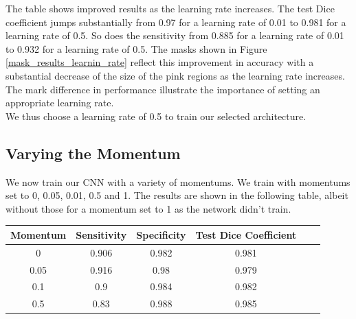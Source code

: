 \noindent The table shows improved results as the learning rate increases. The test Dice coefficient jumps substantially from 0.97 for a learning rate of 0.01 to 0.981 for a learning rate of 0.5. So does the sensitivity from 0.885 for a learning rate of 0.01 to 0.932 for a learning rate of 0.5. The masks shown in Figure \ref{mask_results_learnin_rate} reflect this improvement in accuracy with a substantial decrease of the size of the pink regions as the learning rate increases. The mark difference in performance illustrate the importance of setting an appropriate learning rate.\\

\noindent We thus choose a learning rate of 0.5 to train our selected architecture.

\subsection{Varying the Momentum}

\noindent We now train our CNN with a variety of momentums. We train with momentums set to 0, 0.05, 0.01, 0.5 and 1. The results are shown in the following table, albeit without those for a momentum set to 1 as the network didn't train.\\

{
\centering
\begin{tabular}{cccccc}
\rowcolor[HTML]{C0C0C0} 
Momentum & Sensitivity & Specificity & Test Dice Coefficient \\ \hline
\rowcolor[HTML]{FFFFFF} 
0        & 0.906       & 0.982       & 0.981                                                        \\ 
\rowcolor[HTML]{FFFFFF} 
0.05     & 0.916       & 0.98       & 0.979                                                        \\ 
\rowcolor[HTML]{FFFFFF} 
0.1      & 0.9         & 0.984         & 0.982                                                        \\
\rowcolor[HTML]{FFFFFF} 
0.5      & 0.83        & 0.988        & 0.985                                                       
\end{tabular}\\
\vspace{0.5cm}
}

